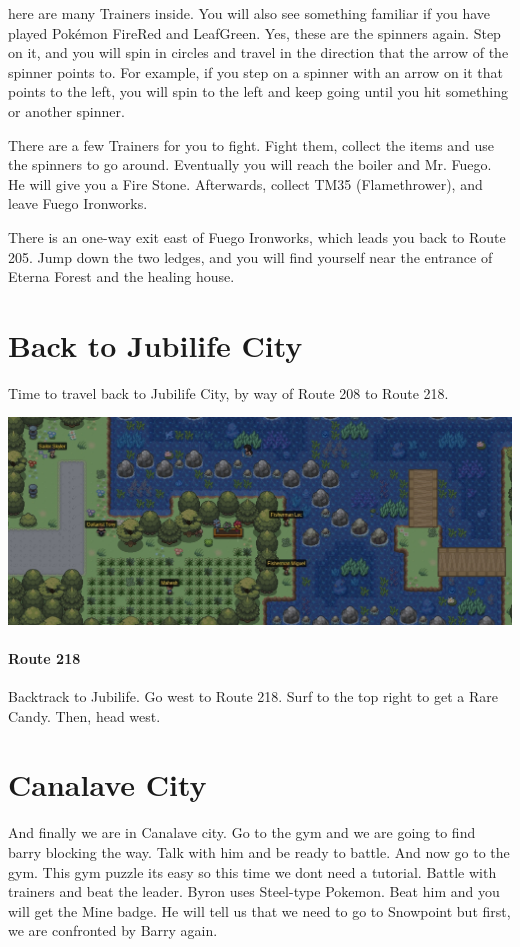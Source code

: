 \documentclass[11pt]{article}
\begin{document}
here are many Trainers inside.
You will also see something familiar if you have played
Pokémon FireRed and LeafGreen.
Yes, these are the spinners again.
Step on it, and you will spin in circles and travel in the direction
that the arrow of the spinner points to.
For example, if you step on a spinner with an arrow on it that points to the left,
you will spin to the left and keep going until you hit something or another spinner.

There are a few Trainers for you to fight.
Fight them, collect the items and use the spinners to go around.
Eventually you will reach the boiler and Mr. Fuego.
He will give you a Fire Stone.
Afterwards, collect TM35 (Flamethrower), and leave Fuego Ironworks.

There is an one-way exit east of Fuego Ironworks, which leads you back to Route 205.
Jump down the two ledges, and you will find yourself near the entrance of
Eterna Forest and the healing house.

\section{Back to Jubilife City}\label{sec:back-to-jubilife-city}
Time to travel back to Jubilife City, by way of Route 208 to Route 218.

\includegraphics[width=\textwidth]{walkthrough/Sinnoh/Route_218}

\paragraph{Route 218}
Backtrack to Jubilife.
Go west to Route 218.
Surf to the top right to get a Rare Candy.
Then, head west.



\section{Canalave City}\label{sec:canalave-city}
And finally we are in Canalave city.
Go to the gym and we are going to find barry blocking the way.
Talk with him and be ready to battle.
And now go to the gym.
This gym puzzle its easy so this time we dont need a tutorial.
Battle with trainers and beat the leader.
Byron uses Steel-type Pokemon.
Beat him and you will get the Mine badge.
He will tell us that we need to go to Snowpoint but first,
we are confronted by Barry again.
\end{document}
